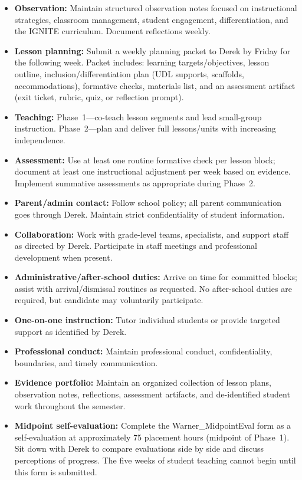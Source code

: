 \documentclass[10pt]{article}
\begin{document}
\begin{itemize}[leftmargin=*,itemsep=0.25em]
  \item \textbf{Observation:} Maintain structured observation notes focused on instructional strategies, classroom management, student engagement, differentiation, and the IGNITE curriculum. Document reflections weekly.
  \item \textbf{Lesson planning:} Submit a weekly planning packet to Derek by Friday for the following week. Packet includes: learning targets/objectives, lesson outline, inclusion/differentiation plan (UDL supports, scaffolds, accommodations), formative checks, materials list, and an assessment artifact (exit ticket, rubric, quiz, or reflection prompt).
  \item \textbf{Teaching:} Phase~1---co-teach lesson segments and lead small-group instruction. Phase~2---plan and deliver full lessons/units with increasing independence.
  \item \textbf{Assessment:} Use at least one routine formative check per lesson block; document at least one instructional adjustment per week based on evidence. Implement summative assessments as appropriate during Phase~2.
  \item \textbf{Parent/admin contact:} Follow school policy; all parent communication goes through Derek. Maintain strict confidentiality of student information.
  \item \textbf{Collaboration:} Work with grade-level teams, specialists, and support staff as directed by Derek. Participate in staff meetings and professional development when present.
  \item \textbf{Administrative/after-school duties:} Arrive on time for committed blocks; assist with arrival/dismissal routines as requested. No after-school duties are required, but candidate may voluntarily participate.
  \item \textbf{One-on-one instruction:} Tutor individual students or provide targeted support as identified by Derek.
  \item \textbf{Professional conduct:} Maintain professional conduct, confidentiality, boundaries, and timely communication.
  \item \textbf{Evidence portfolio:} Maintain an organized collection of lesson plans, observation notes, reflections, assessment artifacts, and de-identified student work throughout the semester.
  \item \textbf{Midpoint self-evaluation:} Complete the Warner\_MidpointEval form as a self-evaluation at approximately 75 placement hours (midpoint of Phase~1). Sit down with Derek to compare evaluations side by side and discuss perceptions of progress. The five weeks of student teaching cannot begin until this form is submitted.

\end{itemize}
\end{document}
